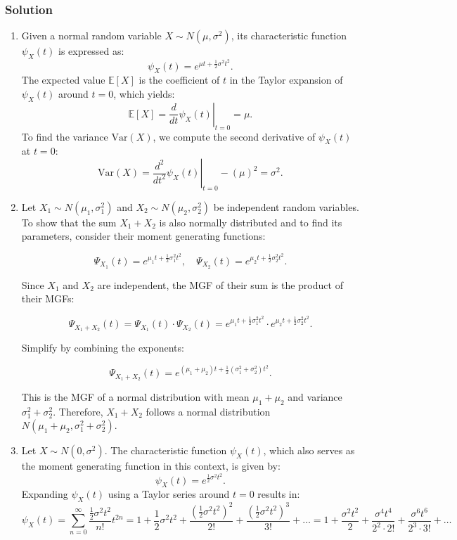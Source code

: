 \documentclass{article}
\begin{document}
\subsubsection*{Solution}
\begin{enumerate}[label=(\alph*)]
    \item Given a normal random variable \( X \sim N(\mu, \sigma^2) \), its characteristic function \( \psi_X(t) \) is expressed as:
    \[
    \psi_X(t) = e^{\mu t + \frac{1}{2} \sigma^2 t^2}.
    \]
    The expected value \( \mathbb{E}[X] \) is the coefficient of \( t \) in the Taylor expansion of \( \psi_X(t) \) around \( t=0 \), which yields:
    \[
    \mathbb{E}[X] = \left. \frac{d}{dt}\psi_X(t) \right|_{t=0} = \mu.
    \]
    To find the variance \( \text{Var}(X) \), we compute the second derivative of \( \psi_X(t) \) at \( t=0 \):
    \[
    \text{Var}(X) = \left. \frac{d^2}{dt^2}\psi_X(t) \right|_{t=0} - (\mu)^2 = \sigma^2.
    \]

    \item Let \( X_1 \sim N(\mu_1, \sigma_1^2) \) and \( X_2 \sim N(\mu_2, \sigma_2^2) \) be independent random variables. To show that the sum \( X_1 + X_2 \) is also normally distributed and to find its parameters, consider their moment generating functions:

    \[
    \Psi_{X_1}(t) = e^{\mu_1 t + \frac{1}{2} \sigma_1^2 t^2}, \quad \Psi_{X_2}(t) = e^{\mu_2 t + \frac{1}{2} \sigma_2^2 t^2}.
    \]
    
    Since \( X_1 \) and \( X_2 \) are independent, the MGF of their sum is the product of their MGFs:
    
    \[
    \Psi_{X_1 + X_2}(t) = \Psi_{X_1}(t) \cdot \Psi_{X_2}(t) = e^{\mu_1 t + \frac{1}{2} \sigma_1^2 t^2} \cdot e^{\mu_2 t + \frac{1}{2} \sigma_2^2 t^2}.
    \]
    
    Simplify by combining the exponents:
    
    \[
    \Psi_{X_1 + X_2}(t) = e^{(\mu_1 + \mu_2) t + \frac{1}{2} (\sigma_1^2 + \sigma_2^2) t^2}.
    \]
    
    This is the MGF of a normal distribution with mean \( \mu_1 + \mu_2 \) and variance \( \sigma_1^2 + \sigma_2^2 \). Therefore, \( X_1 + X_2 \) follows a normal distribution \( N(\mu_1 + \mu_2, \sigma_1^2 + \sigma_2^2) \).
    \item 

    Let \( X \sim N(0, \sigma^2) \). The characteristic function \( \psi_X(t) \), which also serves as the moment generating function in this context, is given by:
    \[
    \psi_X(t) = e^{\frac{1}{2} \sigma^2 t^2}.
    \]
    Expanding \( \psi_X(t) \) using a Taylor series around \( t = 0 \) results in:
    \[
    \psi_X(t) = \sum_{n=0}^{\infty} \frac{\frac{1}{2}\sigma^2 t^2}{n!} t^{2n} = 1 + \frac{1}{2}\sigma^2 t^2 + \frac{(\frac{1}{2}\sigma^2 t^2)^2}{2!} + \frac{(\frac{1}{2}\sigma^2 t^2)^3}{3!} + \ldots
= 1 + \frac{\sigma^2 t^2}{2 } + \frac{\sigma^4 t^4}{2^2 \cdot 2!} + \frac{\sigma^6 t^6}{2^3 \cdot 3!} + \ldots
    \]
    

\end{enumerate}
\end{document}
